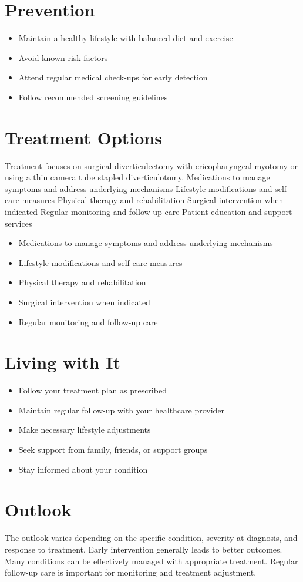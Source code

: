 \section{Prevention}
\begin{itemize}[noitemsep]
  \item Maintain a healthy lifestyle with balanced diet and exercise
  \item Avoid known risk factors
  \item Attend regular medical check-ups for early detection
  \item Follow recommended screening guidelines
\end{itemize}
\section{Treatment Options}
Treatment focuses on surgical diverticulectomy with cricopharyngeal myotomy or using a thin camera tube stapled diverticulotomy. Medications to manage symptoms and address underlying mechanisms Lifestyle modifications and self-care measures Physical therapy and rehabilitation Surgical intervention when indicated Regular monitoring and follow-up care Patient education and support services

\begin{itemize}[noitemsep]
  \item Medications to manage symptoms and address underlying mechanisms
  \item Lifestyle modifications and self-care measures
  \item Physical therapy and rehabilitation
  \item Surgical intervention when indicated
  \item Regular monitoring and follow-up care
\end{itemize}
\section{Living with It}
\begin{itemize}[noitemsep]
  \item Follow your treatment plan as prescribed
  \item Maintain regular follow-up with your healthcare provider
  \item Make necessary lifestyle adjustments
  \item Seek support from family, friends, or support groups
  \item Stay informed about your condition
\end{itemize}
\section{Outlook}
The outlook varies depending on the specific condition, severity at diagnosis, and response to treatment. Early intervention generally leads to better outcomes. Many conditions can be effectively managed with appropriate treatment. Regular follow-up care is important for monitoring and treatment adjustment.
